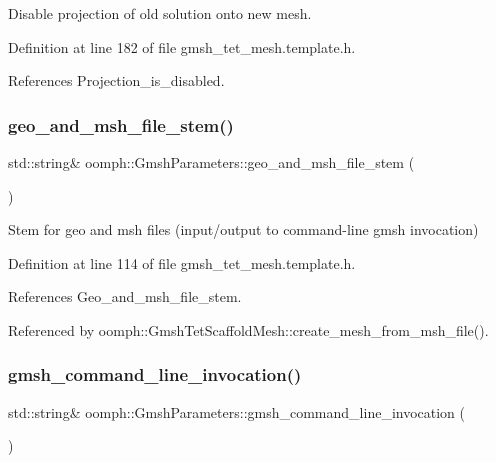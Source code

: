 Disable projection of old solution onto new mesh. 



Definition at line 182 of file gmsh\+\_\+tet\+\_\+mesh.\+template.\+h.



References Projection\+\_\+is\+\_\+disabled.

\mbox{\label{classoomph_1_1GmshParameters_ab9ae54d3d474392b5aefcf2a12aae1a8}} 
\subsubsection{\texorpdfstring{geo\+\_\+and\+\_\+msh\+\_\+file\+\_\+stem()}{geo\_and\_msh\_file\_stem()}}
{\footnotesize\ttfamily std\+::string\& oomph\+::\+Gmsh\+Parameters\+::geo\+\_\+and\+\_\+msh\+\_\+file\+\_\+stem (\begin{DoxyParamCaption}{ }\end{DoxyParamCaption})\hspace{0.3cm}{\ttfamily [inline]}}



Stem for geo and msh files (input/output to command-\/line gmsh invocation) 



Definition at line 114 of file gmsh\+\_\+tet\+\_\+mesh.\+template.\+h.



References Geo\+\_\+and\+\_\+msh\+\_\+file\+\_\+stem.



Referenced by oomph\+::\+Gmsh\+Tet\+Scaffold\+Mesh\+::create\+\_\+mesh\+\_\+from\+\_\+msh\+\_\+file().

\mbox{\label{classoomph_1_1GmshParameters_aaf19a5b331893637974f5a5be8da048c}} 
\subsubsection{\texorpdfstring{gmsh\+\_\+command\+\_\+line\+\_\+invocation()}{gmsh\_command\_line\_invocation()}}
{\footnotesize\ttfamily std\+::string\& oomph\+::\+Gmsh\+Parameters\+::gmsh\+\_\+command\+\_\+line\+\_\+invocation (\begin{DoxyParamCaption}{ }\end{DoxyParamCaption})\hspace{0.3cm}{\ttfamily [inline]}}



